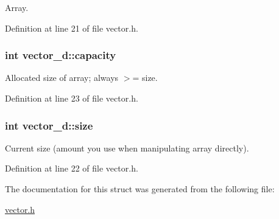 Array. 



Definition at line 21 of file vector.h.

\hypertarget{structvector__d_acc924985e421a81b7acb5a2ee8eecfaa}{
\subsubsection[{capacity}]{\setlength{\rightskip}{0pt plus 5cm}int {\bf vector\_\-d::capacity}}}
\label{structvector__d_acc924985e421a81b7acb5a2ee8eecfaa}


Allocated size of array; always $>$= size. 



Definition at line 23 of file vector.h.

\hypertarget{structvector__d_a0267fa83b14889786ec36cdbe78a71b3}{
\subsubsection[{size}]{\setlength{\rightskip}{0pt plus 5cm}int {\bf vector\_\-d::size}}}
\label{structvector__d_a0267fa83b14889786ec36cdbe78a71b3}


Current size (amount you use when manipulating array directly). 



Definition at line 22 of file vector.h.



The documentation for this struct was generated from the following file:\begin{DoxyCompactItemize}
\item 
\hyperlink{vector_8h}{vector.h}\end{DoxyCompactItemize}

